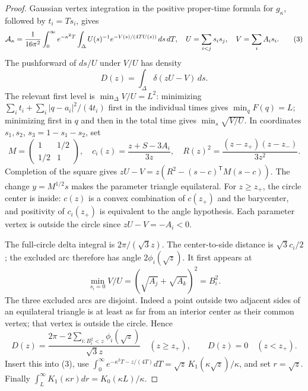 \documentclass[11pt]{article}
\begin{document}
\begin{proof}
Gaussian vertex integration in the positive proper-time formula for
\(g_\kappa\), followed by \(t_i=Ts_i\), gives
\[
 {\cal A}_\kappa=\frac1{16\pi^2}\int_0^\infty e^{-\kappa^2T}
 \int_\Delta U(s)^{-1}e^{-V(s)/(4TU(s))}\,ds\,dT,\quad
 U=\sum_{i<j}s_is_j,\quad V=\sum_iA_is_i.
 \tag{3}
\]
The pushforward of \(ds/U\) under \(V/U\) has density
\[
 D(z)=\int_\Delta\delta(zU-V)\,ds.
\]
The relevant first level is \(\min_\Delta V/U=L^2\): minimizing
\(\sum_i t_i+\sum_i|q-a_i|^2/(4t_i)\) first in the individual
times gives \(\min_qF(q)=L\); minimizing first in \(q\) and then
in the total time gives \(\min_s\sqrt{V/U}\).
In coordinates \(s_1,s_2\), \(s_3=1-s_1-s_2\), set
\[
 M=\begin{pmatrix}1&1/2\\1/2&1\end{pmatrix},\quad
 c_i(z)=\frac{z+S-3A_i}{3z},\quad
 R(z)^2=\frac{(z-z_+)(z-z_-)}{3z^2}.
\]
Completion of the square gives
\(zU-V=z(R^2-(s-c)^{\mathsf T}M(s-c))\).
The change \(y=M^{1/2}s\) makes the parameter triangle equilateral.
For \(z\geq z_+\), the circle center is inside: \(c(z)\) is a convex
combination of \(c(z_+)\) and the barycenter, and positivity of
\(c_i(z_+)\) is equivalent to the angle hypothesis.
Each parameter vertex is outside the circle since \(zU-V=-A_i<0\).

The full-circle delta integral is \(2\pi/(\sqrt3z)\).
The center-to-side distance is \(\sqrt3c_i/2\); the excluded arc
therefore has angle \(2\phi_i(\sqrt z)\). It first appears at
\[
 \min_{s_i=0}V/U=(\sqrt{A_j}+\sqrt{A_k})^2=B_i^2.
\]
The three excluded arcs are disjoint. Indeed a point outside two
adjacent sides of an equilateral triangle is at least as far from an
interior center as their common vertex; that vertex is outside the
circle. Hence
\[
 D(z)=\frac{2\pi-2\sum_{i:B_i^2<z}\phi_i(\sqrt z)}{\sqrt3z}
 \quad(z\geq z_+),\qquad D(z)=0\quad(z<z_+).
\]
Insert this into (3), use
\(\int_0^\infty e^{-\kappa^2T-z/(4T)}dT
 =\sqrt z\,K_1(\kappa\sqrt z)/\kappa\),
and set \(r=\sqrt z\).
Finally \(\int_L^\infty K_1(\kappa r)dr=K_0(\kappa L)/\kappa\).
\end{proof}
\end{document}
